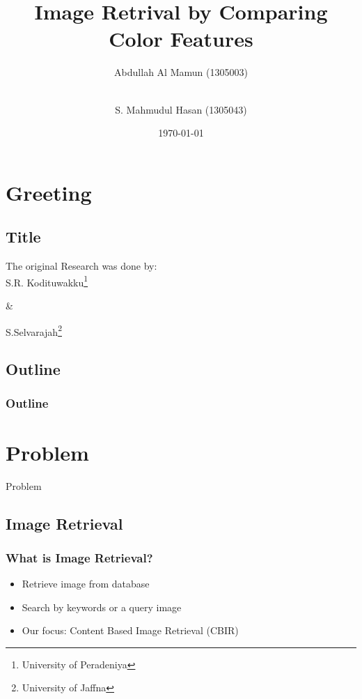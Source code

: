 \documentclass[15pt]{beamer}
\title{Image Retrival by Comparing Color Features}
\author[Mamun \and Mahmudul]{Abdullah Al Mamun (1305003) \and \\ S. Mahmudul Hasan (1305043)}
\institute[BUET]{Bangladesh University of Engineering and Technology}
\date{\today}
\begin{document}
\section*{Greeting}
\subsection*{Title}



\begin{frame}
\titlepage
\end{frame}


\begin{frame}
\fontsize{18pt}{20}\selectfont
\centering
The original Research was done by:\\[\baselineskip]
S.R. Kodituwakku\footnote{University of Peradeniya}\\[\baselineskip]
\centerline{\&}\medskip
S.Selvarajah\footnote{University of Jaffna}
\end{frame}


\subsection*{Outline}
\begin{frame}
\frametitle{Outline}
\tableofcontents
\end{frame}


\section{Problem}

\begin{frame}
\begin{center}
\Huge Problem
\end{center}
\end{frame}

\subsection{Image Retrieval}

\begin{frame}
\frametitle{What is Image Retrieval?}
\begin{itemize}[label=$\blacksquare$]
\item Retrieve image from database
\item Search by keywords or a query image\\[\baselineskip]
\pause
\item Our focus: Content Based Image Retrieval (CBIR)
\end{itemize}
\end{frame}
\end{document}
